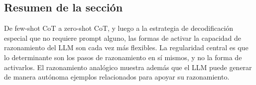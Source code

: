 \subsection{Resumen de la sección}

De few-shot CoT a zero-shot CoT, y luego a la estrategia de decodificación especial que no requiere prompt alguno, las formas de activar la capacidad de razonamiento del LLM son cada vez más flexibles. La regularidad central es que lo determinante son los pasos de razonamiento en sí mismos, y no la forma de activarlos. El razonamiento analógico muestra además que el LLM puede generar de manera autónoma ejemplos relacionados para apoyar su razonamiento.
